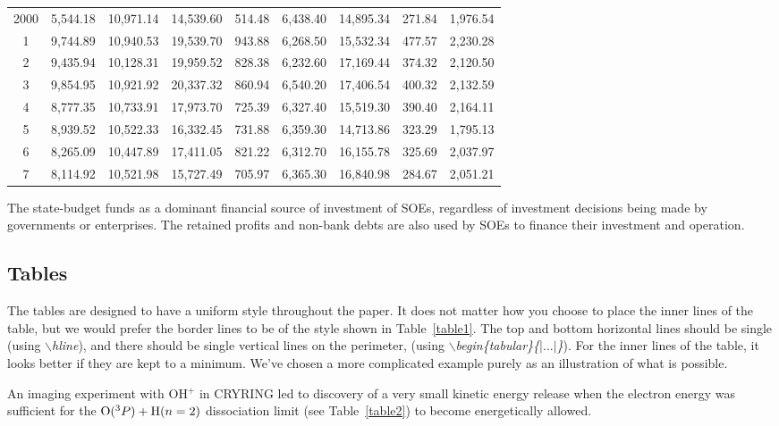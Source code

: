 \documentclass{ws-procs9x6}
\begin{document}
\begin{sidewaystable}
{\begin{tabular}{@{}ccccccccc@{}}
2000 &5,544.18 &10,971.14 &14,539.60 &514.48 &6,438.40 &14,895.34
&271.84 &1,976.54\\ 
1 &9,744.89 &10,940.53 &19,539.70 &943.88 &6,268.50 &15,532.34 &477.57
&2,230.28\\
2 &9,435.94 &10,128.31 &19,959.52 &828.38 &6,232.60 &17,169.44 &374.32
&2,120.50\\
3 &9,854.95 &10,921.92 &20,337.32 &860.94 &6,540.20 &17,406.54 &400.32
&2,132.59\\
4 &8,777.35 &10,733.91 &17,973.70 &725.39 &6,327.40 &15,519.30 &390.40
&2,164.11\\
5 &8,939.52 &10,522.33 &16,332.45 &731.88 &6,359.30 &14,713.86 &323.29
&1,795.13\\
6 &8,265.09 &10,447.89 &17,411.05 &821.22 &6,312.70 &16,155.78 &325.69
&2,037.97\\
7 &8,114.92 &10,521.98 &15,727.49 &705.97 &6,365.30 &16,840.98 &284.67
&2,051.21\\
\hline
\end{tabular}}
\begin{tabnote}
The state-budget funds as a dominant financial source of investment 
of SOEs, regardless of investment decisions being made by governments 
or enterprises. The retained profits and non-bank debts are also used by
SOEs to finance their investment and operation.
\end{tabnote}
\end{sidewaystable}

\subsection{Tables}
The tables are designed to have a uniform style throughout the 
paper. It does not matter how you choose to place
the inner lines of the table, but we would prefer the border
lines to be of the style shown in Table~\ref{table1}.  
The top and bottom horizontal lines should be single 
(using {\em $\backslash$hline}), and there should be single 
vertical lines on the perimeter, (using 
{\em  $\backslash$begin\{tabular\}\{$|...|$\}}).  For the inner
lines of the table, it looks better if they are kept to a
minimum. We've chosen a more complicated example purely as an 
illustration of what is possible.

An imaging experiment with OH$^+$ in CRYRING led to discovery of a
very small kinetic energy release when the electron energy was
sufficient for the ${\rm O}(^3P) + {\rm H}(n=2)$ dissociation limit
(see Table~\ref{table2}) to become energetically allowed.
\end{document}
